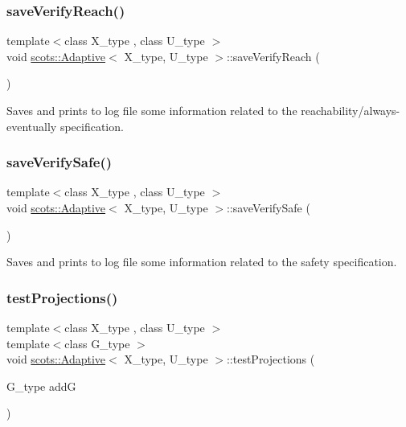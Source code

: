 \subsubsection{\texorpdfstring{save\+Verify\+Reach()}{saveVerifyReach()}}
{\footnotesize\ttfamily template$<$class X\+\_\+type , class U\+\_\+type $>$ \\
void \hyperlink{classscots_1_1Adaptive}{scots\+::\+Adaptive}$<$ X\+\_\+type, U\+\_\+type $>$\+::save\+Verify\+Reach (\begin{DoxyParamCaption}{ }\end{DoxyParamCaption})\hspace{0.3cm}{\ttfamily [inline]}}

Saves and prints to log file some information related to the reachability/always-\/eventually specification. \mbox{\label{classscots_1_1Adaptive_a629133566055e6445983b86082838b96}} 
\subsubsection{\texorpdfstring{save\+Verify\+Safe()}{saveVerifySafe()}}
{\footnotesize\ttfamily template$<$class X\+\_\+type , class U\+\_\+type $>$ \\
void \hyperlink{classscots_1_1Adaptive}{scots\+::\+Adaptive}$<$ X\+\_\+type, U\+\_\+type $>$\+::save\+Verify\+Safe (\begin{DoxyParamCaption}{ }\end{DoxyParamCaption})\hspace{0.3cm}{\ttfamily [inline]}}

Saves and prints to log file some information related to the safety specification. \mbox{\label{classscots_1_1Adaptive_aa4f1995704cf927fff530e715a6214ec}} 
\subsubsection{\texorpdfstring{test\+Projections()}{testProjections()}}
{\footnotesize\ttfamily template$<$class X\+\_\+type , class U\+\_\+type $>$ \\
template$<$class G\+\_\+type $>$ \\
void \hyperlink{classscots_1_1Adaptive}{scots\+::\+Adaptive}$<$ X\+\_\+type, U\+\_\+type $>$\+::test\+Projections (\begin{DoxyParamCaption}\item[{G\+\_\+type}]{addG }\end{DoxyParamCaption})\hspace{0.3cm}{\ttfamily [inline]}}

